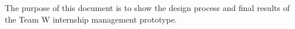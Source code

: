 The purpose of this document is to show the design process and final results of the Team W internship 
management prototype.